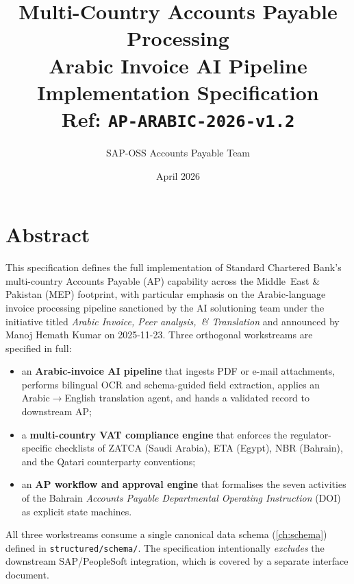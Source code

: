 \documentclass[11pt,a4paper,twoside]{report}
\newcommand{\corpus}{}
\begin{document}
\title{\vspace{-2em}\Large Multi-Country Accounts Payable Processing \\
\textbf{Arabic Invoice AI Pipeline} \\
\large Implementation Specification \\
\small Ref: \texttt{AP-ARABIC-2026-v1.2}}
\author{SAP-OSS Accounts Payable Team}
\date{April 2026}

\maketitle


\chapter*{Abstract}

This specification defines the full implementation of Standard Chartered
Bank's multi-country Accounts Payable (AP) capability across the
Middle~East \& Pakistan (MEP) footprint, with particular emphasis on the
Arabic-language invoice processing pipeline sanctioned by the AI solutioning
team under the initiative titled \emph{Arabic Invoice, Peer analysis,~\& Translation}
and announced by Manoj Hemath Kumar on 2025-11-23. Three orthogonal
workstreams are specified in full:

\begin{itemize}
\item an \textbf{Arabic-invoice AI pipeline} that ingests PDF or e-mail
attachments, performs bilingual OCR and schema-guided field
extraction, applies an Arabic$\to$English translation agent,
and hands a validated record to downstream AP;
\item a \textbf{multi-country VAT compliance engine} that enforces the
regulator-specific checklists of ZATCA (Saudi Arabia), ETA
(Egypt), NBR (Bahrain), and the Qatari counterparty conventions;
\item an \textbf{AP workflow and approval engine} that formalises the
seven activities of the Bahrain \emph{Accounts Payable Departmental
Operating Instruction} (DOI) as explicit state machines.
\end{itemize}

All three workstreams consume a single canonical data schema
(\cref{ch:schema}) defined in \corpus\texttt{structured/schema/}. The
specification intentionally \emph{excludes} the downstream SAP/PeopleSoft
integration, which is covered by a separate interface document.
\end{document}
